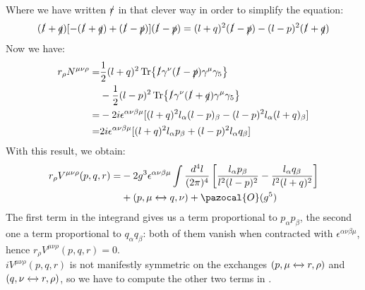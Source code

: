 \documentclass[../main.tex]{subfiles}
\begin{document}
Where we have written $\slashed{r}$ in that clever way in order to simplify the equation:
\[
(\slashed{l}+\slashed{q})[-(\slashed{l}+\slashed{q})+(\slashed{l}-\slashed{p})](\slashed{l}-\slashed{p})=(l+q)^2(\slashed{l}-\slashed{p})-(l-p)^2(\slashed{l}+\slashed{q})
\]
Now we have:
\begin{align*}
r_\rho N^{\mu\nu\rho}=&\frac{1}{2}(l+q)^2\Tr{\slashed{l}\gamma^\nu(\slashed{l}-\slashed{p})\gamma^\mu\gamma_5}\\
&-\frac{1}{2}(l-p)^2\Tr{\slashed{l}\gamma^\nu(\slashed{l}+\slashed{q})\gamma^\mu\gamma_5}\\
=&-2i\epsilon^{\alpha\nu\beta\mu}[(l+q)^2l_\alpha(l-p)_\beta-(l-p)^2l_\alpha(l+q)_\beta]\\
=&2i\epsilon^{\alpha\nu\beta\mu}[(l+q)^2l_\alpha p_\beta+(l-p)^2l_\alpha q_\beta]
\end{align*}
With this result, we obtain:
\begin{align*}
r_\rho V^{\mu\nu\rho}(p,q,r)=&-2g^3\epsilon^{\alpha\nu\beta\mu}\int\frac{d^4l}{(2\pi)^4}\left[\frac{l_\alpha p_\beta}{l^2(l-p)^2}-\frac{l_\alpha q_\beta}{l^2(l+q)^2}\right]\\
&+(p,\mu\xleftrightarrow[]{}q,\nu)+\pazocal{O}(g^5)
\end{align*}
The first term in the integrand gives us a term proportional to $p_\alpha p_\beta$, the second one a term proportional to $q_\alpha q_\beta$: both of them vanish when contracted with $\epsilon^{\alpha\nu\beta\mu}$, hence $r_\rho V^{\mu\nu\rho}(p,q,r)=0$.\\
$iV^{\mu\nu\rho}(p,q,r)$ is not manifestly symmetric on the exchanges $(p,\mu\xleftrightarrow[]{}r,\rho)$ and $(q,\nu\xleftrightarrow[]{}r,\rho)$, so we have to compute the other two terms in .
\end{document}

